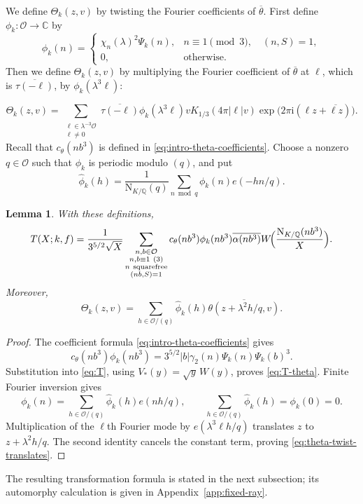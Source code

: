 \documentclass[11pt,a4paper]{article}
\numberwithin{equation}{section}
\numberwithin{figure}{section}
\newtheorem{lemma}[theorem]{Lemma}
\theoremstyle{definition}
\theoremstyle{remark}
\newcommand{\Q}{\mathbb Q}
\newcommand{\NK}{\mathrm N_{K/\Q}}
\newcommand{\OO}{\mathcal O}
\begin{document}
We define $\Theta_k(z,v)$ by twisting the Fourier coefficients of $\overline\theta$. First define $\phi_k:\OO\to\mathbb C$ by
\[
 \phi_k(n)=
 \begin{cases}
  \chi_n(\lambda)^2\Psi_k(n),&n\equiv1\pmod3,\quad(n,S)=1,\\
  0,&\text{otherwise}.
 \end{cases}
\]
Then we define $\Theta_k(z,v)$ by multiplying the Fourier coefficient of
$\overline\theta$ at $\ell$, which is $\overline{\tau(-\ell)}$, by $\phi_k(\lambda^3\ell)$:

\begin{equation}\label{eq:twisted-theta-definition}
 \Theta_k(z,v)=
 \sum_{\substack{\ell\in\lambda^{-3}\OO\\\ell\ne0}}
 \overline{\tau(-\ell)}\phi_k(\lambda^3\ell)
 vK_{1/3}(4\pi|\ell|v)
 \exp\!\bigl(2\pi\mathrm i(\ell z+\overline{\ell z})\bigr).
\end{equation}
Recall that $c_\theta(nb^3)$ is defined in
\eqref{eq:intro-theta-coefficients}. 
Choose a nonzero $q\in\OO$ such that $\phi_k$ is periodic modulo $(q)$, and put
\[
 \widehat\phi_k(h)=\frac1{\NK(q)}\sum_{n\bmod q}\phi_k(n)e(-hn/q).
\]

\begin{lemma}\label{lem:theta-realization}
With these definitions,
\begin{equation}\label{eq:T-theta}
 T(X;k,f)=\frac1{3^{5/2}\sqrt X}
 \sum_{\substack{n,b\in\OO\\n,b\equiv1\ (3)\\n\ {\rm squarefree}\\(nb,S)=1}}
 c_\theta(nb^3)\phi_k(nb^3)\overline{\alpha(nb^3)}
 W\!\Bigl(\frac{\NK(nb^3)}X\Bigr).
\end{equation}
Moreover,
\begin{equation}\label{eq:theta-twist-translates}
 \Theta_k(z,v)=\sum_{h\in\OO/(q)}\widehat\phi_k(h)
       \overline{\theta(z+\lambda^2h/q,v)}.
\end{equation}
\end{lemma}
\begin{proof}
The coefficient formula \eqref{eq:intro-theta-coefficients} gives
\[
 c_\theta(nb^3)\phi_k(nb^3)
 =3^{5/2}|b|\gamma_2(n)\Psi_k(n)\Psi_k(b)^3.
\]
Substitution into \eqref{eq:T}, using $V_*(y)=\sqrt y\,W(y)$,
proves \eqref{eq:T-theta}.
Finite Fourier inversion gives
\[
 \phi_k(n)=\sum_{h\in\OO/(q)}\widehat\phi_k(h)e(nh/q),
 \qquad
 \sum_{h\in\OO/(q)}\widehat\phi_k(h)=\phi_k(0)=0.
\]
Multiplication of the $\ell$th Fourier mode by
$e(\lambda^3\ell h/q)$ translates $z$ to $z+\lambda^2h/q$.
The second identity cancels the constant term, proving
\eqref{eq:theta-twist-translates}.
\end{proof}
The resulting transformation formula is stated in the next subsection;
its automorphy calculation is given in Appendix~\ref{app:fixed-ray}.
\end{document}
